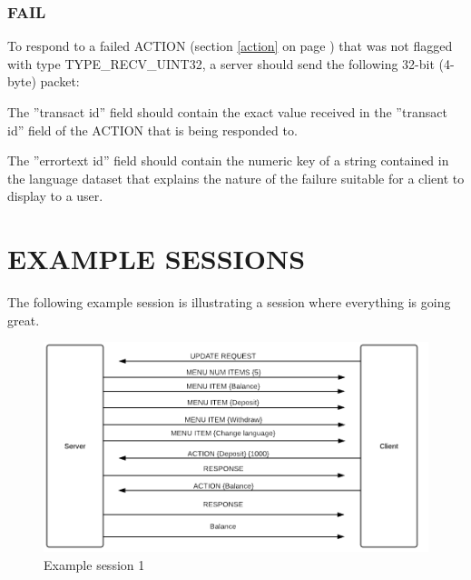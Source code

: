 \documentclass[a4paper,11pt]{article}
\begin{document}
\subsubsection{FAIL}
\label{server_fail}
\hfill\begin{minipage}{\dimexpr\textwidth-1.4cm}
To respond to a failed ACTION (section \ref{action} on page \pageref{action})
that was not flagged with type TYPE\_RECV\_UINT32, a server should send the following
32-bit (4-byte) packet:

\vspace{0.2cm}


\vspace{0.5cm}

The ''transact id'' field should contain the exact value received in
the ''transact id'' field of the ACTION that is being responded to.

\vspace{0.3cm}

The ''errortext id'' field should contain the numeric key of a
string contained in the language dataset that explains the nature
of the failure suitable for a client to display to a user.
\end{minipage}

\newpage
\section{EXAMPLE SESSIONS}

\bigskip
The following example session is illustrating a session where everything is 
going great.

\begin{figure}[H]
\centering
\includegraphics[scale=0.8]{Session_ok.png}
\caption{Example session 1}
\end{figure}
\end{document}
